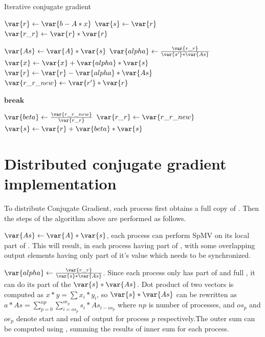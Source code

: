 \documentclass[thesis=M,english]{FITthesis}[2019/12/23]
\begin{document}
\begin{algorithm}
    \caption{Iterative conjugate gradient}\label{app:cg:algo}
    \begin{algorithmic}
        \State $\var{r} \gets \var{b - A * x}$
        \State $\var{s} \gets \var{r}$
        \State $\var{r\_r} \gets \var{r} * \var{r}$

        \State $\var{As} \gets \var{A} * \var{s}$
        \State $\var{alpha} \gets \frac{\var{r\_r}}{\var{s'}*\var{As}} $
        \State $\var{x} \gets \var{x} + \var{alpha} * \var{s}$
        \State $\var{r} \gets \var{r} - \var{alpha} * \var{As}$
        \State $\var{r\_r\_new} \gets \var{r'} * \var{r}$

        \State $\textbf{break}$
        \EndIf

        \State $\var{beta} \gets \frac{\var{r\_r\_new}}{\var{r\_r}}$
        \State $\var{r\_r} \gets \var{r\_r\_new}$
        \State $\var{s} \gets \var{r} + \var{beta} * \var{s}$

        \EndFor

        \EndFunction
    \end{algorithmic}
\end{algorithm}

\section{Distributed conjugate gradient implementation}

To distribute Conjugate Gradient, each process first obtains a full copy of .
Then the steps of the algorithm above are performed as follows.

$\var{As} \gets \var{A} * \var{s}$, each process can perform SpMV on its local part of
. This will result, in each process having part of , with some overlapping
output elements having only part of it's value which needs to be synchronized.

$\var{alpha} \gets \frac{\var{r\_r}}{\var{s} * \var{As}}$. Since each process only has part of
 and full , it can do its part of the $\var{s} * \var{As}$.
Dot product of two vectors is computed as $x * y = \sum x_i * y_i$, so $\var{s} * \var{As}$
can be rewritten as $a * As = \sum_{p=0}^{np} \sum_{i=os_p}^{oe_p} s_i * As_{i-os_p}$ where
$np$ is number of processes, and $os_p$ and $oe_p$ denote start and end of output for process
$p$ respectively.The outer sum can be computed using ,
summing the results of inner sum for each process.
\end{document}
